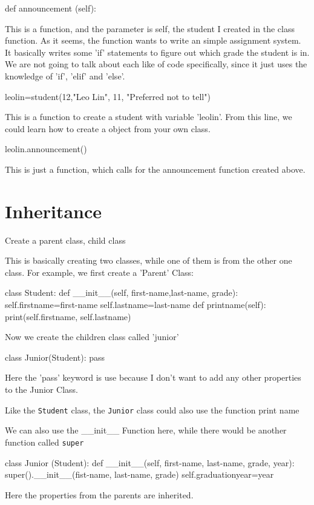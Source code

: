\documentclass[12pt]{article}
\begin{document}
\begin{python}
	def announcement (self):
\end{python}
\par This is a function, and the parameter is self, the student I created in the class function.
As it seems, the function wants to write an simple assignment system.
It basically writes some 'if' statements to figure out which grade the student is in. We are not going to talk about each like of code specifically, since it just uses the knowledge of 'if', 'elif' and 'else'.
\begin{python}
	leolin=student(12,"Leo Lin", 11, "Preferred not to tell")
\end{python}
\par This is a function to create a student with variable 'leolin'.
From this line, we could learn how to create a object from your own class.
\begin{python}
	leolin.announcement()
\end{python}
This is just a function, which calls for the announcement function created above.
\section{Inheritance}
Create a parent class, child class
\par This is basically creating two classes, while one of them is from the other one class.
For example, we first create a 'Parent' Class:
\begin{python}
	class Student:
		def \_\_init\_\_(self, first-name,last-name, grade):
			self.firstname=first-name
			self.lastname=last-name
		def printname(self):
			print(self.firstname, self.lastname)
\end{python}
\par Now we create the children class called 'junior'
\begin{python}
	class Junior(Student):
		pass
\end{python}
\par Here the 'pass' keyword is use because I don't want to add any other properties to the Junior Class.
\par Like the \texttt{Student} class, the \texttt{Junior} class could also use the function print name
\par We can also use the \_\_init\_\_ Function here, while there would be another function called \texttt{super}
\begin{python}
	class Junior (Student):
		def \_\_init\_\_(self, first-name, last-name, grade, year):
		super().\_\_init\_\_(fist-name, last-name, grade)
		self.graduationyear=year
\end{python}
\par Here the properties from the parents are inherited.
\end{document}
